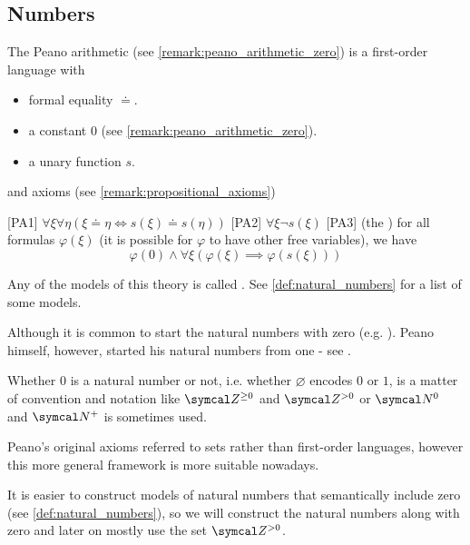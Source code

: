 \subsection{Numbers}\label{subsec:numbers}

\begin{definition}\label{def:peano_arithmetic}\cite[1]{Peano1889}
  The Peano arithmetic (see \cref{remark:peano_arithmetic_zero}) is a first-order language with 
  \begin{itemize}
    \item formal equality \( \doteq \).
    \item a constant \( 0 \) (see \cref{remark:peano_arithmetic_zero}).
    \item a unary function \( s \).
  \end{itemize}
  and axioms (see \cref{remark:propositional_axioms})
  \begin{defenum}
    [PA1] \( \forall \xi \forall \eta (\xi \doteq \eta \iff s(\xi) \doteq s(\eta)) \)
    [PA2] \( \forall \xi \neg s(\xi) \)
    [PA3] (the ) for all formulas \( \varphi(\xi) \) (it is possible for \( \varphi \) to have other free variables), we have
    \begin{equation*}
      \varphi(0) \land \forall \xi (\varphi(\xi) \implies \varphi(s(\xi)))
    \end{equation*}
  \end{defenum}

  Any of the models of this theory is called . See \cref{def:natural_numbers} for a list of some models.
\end{definition}

\begin{remark}\label{remark:peano_arithmetic_zero}
  Although it is common to start the natural numbers with zero (e.g. \cite[67]{Enderton1977}). Peano himself, however, started his natural numbers from one - see \cite[1]{Peano1889}.

  Whether \( 0 \) is a natural number or not, i.e. whether \( \varnothing \) encodes \( 0 \) or \( 1 \), is a matter of convention and notation like \( \Cal{Z}^{\geq 0} \) and \( \Cal{Z}^{>0} \) or \( \Cal{N}^0 \) and \( \Cal{N}^+ \) is sometimes used.

  Peano's original axioms referred to sets rather than first-order languages, however this more general framework is more suitable nowadays.

  It is easier to construct models of natural numbers that semantically include zero (see \cref{def:natural_numbers}), so we will construct the natural numbers along with zero and later on mostly use the set \( \Cal{Z}^{>0} \).
\end{remark}

